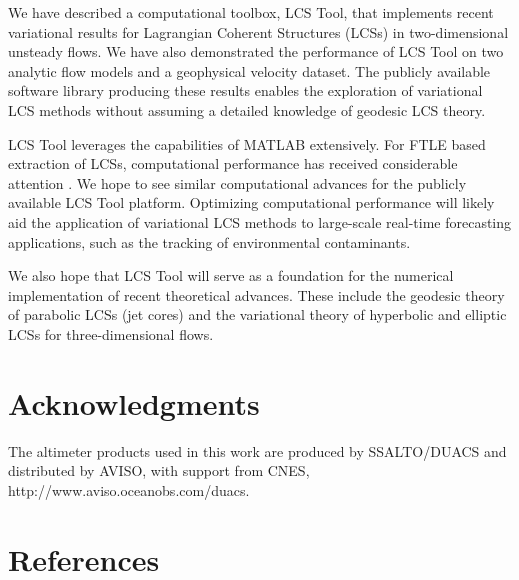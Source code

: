 \documentclass{elsarticle}
\begin{document}
We have described a computational toolbox, LCS Tool, that implements recent variational results for Lagrangian Coherent Structures (LCSs) in two-dimensional unsteady flows. We have also demonstrated the performance of LCS Tool on two analytic flow models and a geophysical velocity dataset. The publicly available software library producing these results enables the exploration of variational LCS methods without assuming a detailed knowledge of geodesic LCS theory.

LCS Tool leverages the capabilities of MATLAB extensively. For FTLE based extraction of LCSs, computational performance has received considerable attention \citep{conti12:_gpu_apu_finit_time_lyapun_expon,miron12:_anisot_lagran_coher_struc}. We hope to see similar computational advances for the publicly available LCS Tool platform. Optimizing computational performance will likely aid the application of variational LCS methods to large-scale real-time forecasting applications, such as the tracking of environmental contaminants\citep{olascoaga12:_forec}.

We also hope that LCS Tool will serve as a foundation for the numerical
implementation of recent theoretical advances. These include the geodesic theory of parabolic LCSs (jet cores)\citep{farazmand14:_shearless} and the variational theory of hyperbolic and elliptic LCSs for three-dimensional
flows\citep{blazevski14:_hyper_ellip_trans_barrier_three}.

\section*{Acknowledgments}

The altimeter products used in this work are produced by SSALTO/DUACS and distributed by AVISO, with support from CNES, http://www.aviso.oceanobs.com/duacs.

\section*{References}

 

\end{document}
